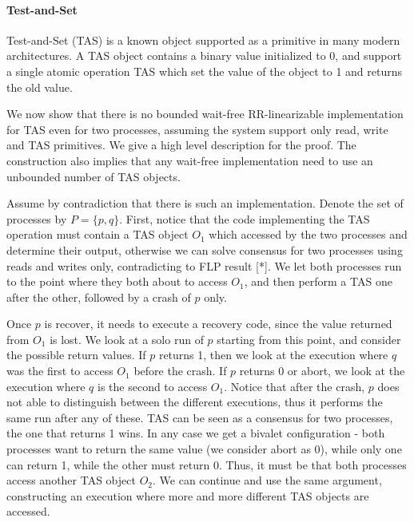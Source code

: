 \documentclass{article}
\begin{document}
\paragraph*{Test-and-Set}

Test-and-Set (TAS) is a known object supported as a primitive in many modern architectures. A TAS object contains a binary value initialized to 0, and support a single atomic operation TAS which set the value of the object to 1 and returns the old value.

We now show that there is no bounded wait-free RR-linearizable implementation for TAS even for two processes, assuming the system support only read, write and TAS primitives. We give a high level description for the proof. The construction also implies that any wait-free implementation need to use an unbounded number of TAS objects.

Assume by contradiction that there is such an implementation. Denote the set of processes by $P=\{p,q\}$. First, notice that the code implementing the TAS operation must contain a TAS object $O_1$ which accessed by the two processes and determine their output, otherwise we can solve consensus for two processes using reads and writes only, contradicting to FLP result [*]. We let both processes run to the point where they both about to access $O_1$, and then perform a TAS one after the other, followed by a crash of $p$ only.

Once $p$ is recover, it needs to execute a recovery code, since the value returned from $O_1$ is lost. We look at a solo run of $p$ starting from this point, and consider the possible return values. If $p$ returns 1, then we look at the execution where $q$ was the first to access $O_1$ before the crash. If $p$ returns 0 or abort, we look at the execution where $q$ is the second to access $O_1$. Notice that after the crash, $p$ does not able to distinguish between the different executions, thus it performs the same run after any of these. TAS can be seen as a consensus for two processes, the one that returns 1 wins. In any case we get a bivalet configuration - both processes want to return the same value (we consider abort as 0), while only one can return 1, while the other must return 0. Thus, it must be that both processes access another TAS object $O_2$. We can continue and use the same argument, constructing an execution where more and more different TAS objects are accessed.




 {}
\end{document}
